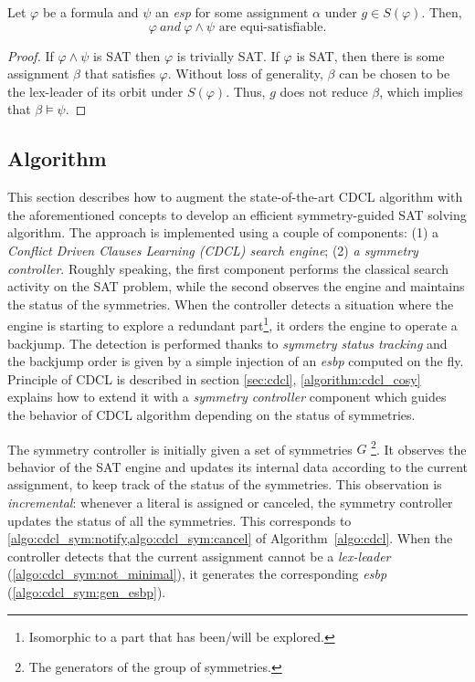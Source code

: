 \begin{theorem}
 Let $\varphi$ be a formula and $\psi$ an \textit{esp} for some assignment $\alpha$ under $g \in S(\varphi)$. Then,
 $$\varphi~and ~\varphi \wedge \psi \text{ are equi-satisfiable}.$$
\end{theorem}
\begin{proof}
 
 If $\varphi \wedge \psi$ is SAT then $\varphi$ is trivially SAT. If
 $\varphi$ is SAT, then there is some assignment $\beta$ that satisfies $\varphi$.
 Without loss of generality, $\beta$ can be chosen to be the lex-leader of its
 orbit under $S(\varphi)$. Thus, $g$ does not reduce $\beta$, which implies that
 $\beta \models \psi$.
 
\end{proof}


\subsection{Algorithm}

This section describes how to augment the state-of-the-art CDCL algorithm with
the aforementioned concepts to develop an efficient symmetry-guided SAT
solving algorithm. 
The approach is implemented using a couple of components: (1) a
\textit{Conflict Driven Clauses Learning (CDCL) search engine}; (2) \textit{a symmetry controller}. Roughly speaking, the first component performs the
classical search activity on the SAT problem, while the second observes the
engine and maintains the status of the symmetries. When the controller detects
a situation where the engine is starting to explore a redundant
part\footnote{Isomorphic to a part that has been/will be explored.}, it orders
the engine to operate a backjump. The detection is performed thanks to
\emph{symmetry status tracking} and the backjump order is given by a simple
injection of an \emph{esbp} computed on the fly.
Principle of CDCL is described in section \ref{sec:cdcl}, \cref{algorithm:cdcl_cosy} explains how to extend it with a \emph{symmetry controller} component which guides the behavior of CDCL algorithm depending on the status of symmetries.

 
 The symmetry controller is initially given a set of symmetries $G$ \footnote{The generators of the group of symmetries.}. It observes the behavior of the SAT engine and updates its internal data according to the current assignment, to keep track of the status of the symmetries. This observation is \emph{incremental}: whenever a literal is assigned or canceled, the symmetry controller updates the status of all the symmetries. This corresponds to \cref{algo:cdcl_sym:notify,algo:cdcl_sym:cancel} of Algorithm~\ref{algo:cdcl}. When the controller detects that the
 current assignment cannot be a \emph{lex-leader} (\cref{algo:cdcl_sym:not_minimal}), it generates the
 corresponding \emph{esbp} (\cref{algo:cdcl_sym:gen_esbp}).
 
